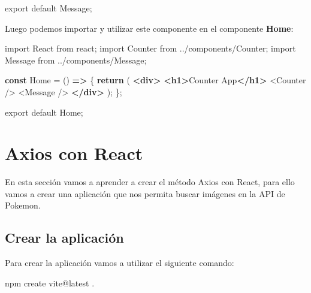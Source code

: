 \documentclass[
  a4paper,
  DIV=11,
  numbers=noendperiod,
  onepage,
  openany]{scrreprt}
\newenvironment{Shaded}{\begin{snugshade}}{\end{snugshade}}
\newcommand{\ControlFlowTok}[1]{\textcolor[rgb]{0.00,0.23,0.31}{\textbf{#1}}}
\newcommand{\ExtensionTok}[1]{\textcolor[rgb]{0.00,0.23,0.31}{#1}}
\newcommand{\FunctionTok}[1]{\textcolor[rgb]{0.28,0.35,0.67}{#1}}
\newcommand{\ImportTok}[1]{\textcolor[rgb]{0.00,0.46,0.62}{#1}}
\newcommand{\KeywordTok}[1]{\textcolor[rgb]{0.00,0.23,0.31}{\textbf{#1}}}
\newcommand{\NormalTok}[1]{\textcolor[rgb]{0.00,0.23,0.31}{#1}}
\newcommand{\OperatorTok}[1]{\textcolor[rgb]{0.37,0.37,0.37}{#1}}
\newcommand{\StringTok}[1]{\textcolor[rgb]{0.13,0.47,0.30}{#1}}
\begin{document}
\begin{tcolorbox}
\begin{Shaded}
\begin{Highlighting}[]
\ImportTok{export} \ImportTok{default}\NormalTok{ Message}\OperatorTok{;}
\end{Highlighting}
\end{Shaded}

Luego podemos importar y utilizar este componente en el componente
\textbf{Home}:

\begin{Shaded}
\begin{Highlighting}[]
\ImportTok{import}\NormalTok{ React }\ImportTok{from} \StringTok{\textquotesingle{}react\textquotesingle{}}\OperatorTok{;}
\ImportTok{import}\NormalTok{ Counter }\ImportTok{from} \StringTok{\textquotesingle{}../components/Counter\textquotesingle{}}\OperatorTok{;}
\ImportTok{import}\NormalTok{ Message }\ImportTok{from} \StringTok{\textquotesingle{}../components/Message\textquotesingle{}}\OperatorTok{;}

\KeywordTok{const}\NormalTok{ Home }\OperatorTok{=}\NormalTok{ () }\KeywordTok{=\textgreater{}}\NormalTok{ \{}
  \ControlFlowTok{return}\NormalTok{ (}
    \KeywordTok{\textless{}div\textgreater{}}
      \KeywordTok{\textless{}h1\textgreater{}}\NormalTok{Counter App}\KeywordTok{\textless{}/h1\textgreater{}}
      \FunctionTok{\textless{}Counter} \FunctionTok{/\textgreater{}}
      \FunctionTok{\textless{}Message} \FunctionTok{/\textgreater{}}
    \KeywordTok{\textless{}/div\textgreater{}}
\NormalTok{  )}\OperatorTok{;}
\NormalTok{\}}\OperatorTok{;}

\ImportTok{export} \ImportTok{default}\NormalTok{ Home}\OperatorTok{;}
\end{Highlighting}
\end{Shaded}

\chapter{Axios con React}\label{axios-con-react}

En esta sección vamos a aprender a crear el método Axios con React, para
ello vamos a crear una aplicación que nos permita buscar imágenes en la
API de Pokemon.

\section{Crear la aplicación}\label{crear-la-aplicaciuxf3n-1}

Para crear la aplicación vamos a utilizar el siguiente comando:

\begin{Shaded}
\begin{Highlighting}[]
\ExtensionTok{npm}\NormalTok{ create vite@latest .}
\end{Highlighting}
\end{Shaded}


\end{tcolorbox}
\end{document}
